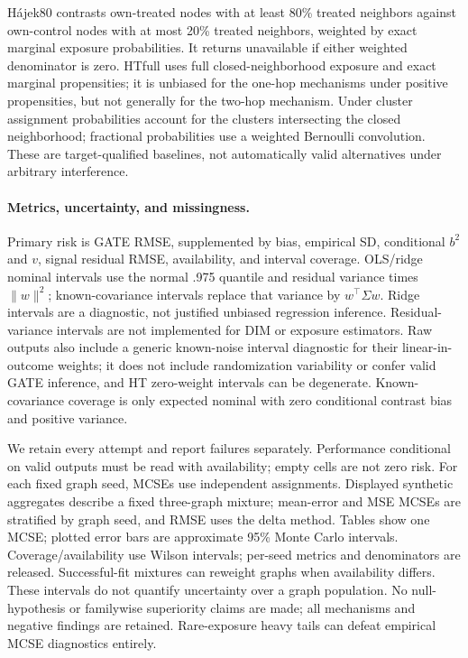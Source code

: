 \documentclass{article}
\begin{document}
H\'ajek80 contrasts own-treated nodes with at least 80\% treated neighbors against own-control nodes with at most 20\% treated neighbors, weighted by exact marginal exposure probabilities. It returns unavailable if either weighted denominator is zero. HTfull uses full closed-neighborhood exposure and exact marginal propensities; it is unbiased for the one-hop mechanisms under positive propensities, but not generally for the two-hop mechanism. Under cluster assignment probabilities account for the clusters intersecting the closed neighborhood; fractional probabilities use a weighted Bernoulli convolution. These are target-qualified baselines, not automatically valid alternatives under arbitrary interference.

\paragraph{Metrics, uncertainty, and missingness.}
Primary risk is GATE RMSE, supplemented by bias, empirical SD, conditional $b^2$ and $v$, signal residual RMSE, availability, and interval coverage. OLS/ridge nominal intervals use the normal .975 quantile and residual variance times $\|w\|^2$; known-covariance intervals replace that variance by $w^\top\Sigma w$. Ridge intervals are a diagnostic, not justified unbiased regression inference. Residual-variance intervals are not implemented for DIM or exposure estimators. Raw outputs also include a generic known-noise interval diagnostic for their linear-in-outcome weights; it does not include randomization variability or confer valid GATE inference, and HT zero-weight intervals can be degenerate. Known-covariance coverage is only expected nominal with zero conditional contrast bias and positive variance.

We retain every attempt and report failures separately. Performance conditional on valid outputs must be read with availability; empty cells are not zero risk. For each fixed graph seed, MCSEs use independent assignments. Displayed synthetic aggregates describe a fixed three-graph mixture; mean-error and MSE MCSEs are stratified by graph seed, and RMSE uses the delta method. Tables show one MCSE; plotted error bars are approximate 95\% Monte Carlo intervals. Coverage/availability use Wilson intervals; per-seed metrics and denominators are released. Successful-fit mixtures can reweight graphs when availability differs. These intervals do not quantify uncertainty over a graph population. No null-hypothesis or familywise superiority claims are made; all mechanisms and negative findings are retained. Rare-exposure heavy tails can defeat empirical MCSE diagnostics entirely.
\end{document}
